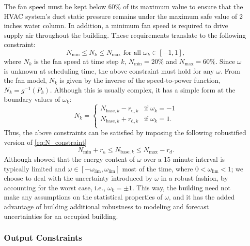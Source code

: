 The fan speed must be kept below 60\% of its maximum value to ensure that the HVAC system's duct static pressure remains under the maximum safe value of 2 inches water column. 
In addition, a minimum fan speed is required to drive supply air throughout the building.
These requirements translate to the following constraint: 
\begin{equation}\label{eq:N_constraint}
N_\text{min} \leq N_k \leq N_\text{max} \text{~for all~} \omega_k \in [-1,1],
\end{equation}
where $N_k$ is the fan speed at time step $k$, $N_\text{min} = 20\%$ and $N_\text{max} = 60\%$.
Since $\omega$ is unknown at scheduling time, the above constraint must hold for any $\omega$. 
From the fan model, $N_k$ is given by the inverse of the speed-to-power function, $N_k = g^{-1}(P_k)$.
Although this is usually complex, it has a simple form at the boundary values of $\omega_k$:
\begin{equation}\label{eq:N_w}
N_k = \begin{cases}
	N_{\text{base},k} - r_{\text{u},k} & \mbox{if } \omega_k = -1 \\ 
	N_{\text{base},k} + r_{\text{d},k} & \mbox{if } \omega_k = 1. \\ 
	\end{cases} 
\end{equation}
Thus, the above constraints can be satisfied by imposing the following robustified version of \eqref{eq:N_constraint}
\begin{equation}\label{eq:N_constraint_rob}
N_\text{min} + r_u \leq N_{\text{base},k} \leq N_\text{max} - r_d.
\end{equation}
Although \cite{Vrettos:2016flexlab1} showed that the energy content of $\omega$ over a 15 minute interval is typically limited and $\omega \in [ -\omega_{\text{lim}}, \omega_{\text{lim}}]$ most of the time, where $0<\omega_{\text{lim}} < 1$;
we choose to deal with the uncertainty introduced by $\omega$ in a robust fashion, by accounting for the worst case, i.e., $\omega_k = \pm 1$.
This way, the building need not make any assumptions on the statistical properties of $\omega$, and it has the added advantage of building additional robustness to modeling and forecast uncertainties for an occupied building.


\subsubsection{Output Constraints}

